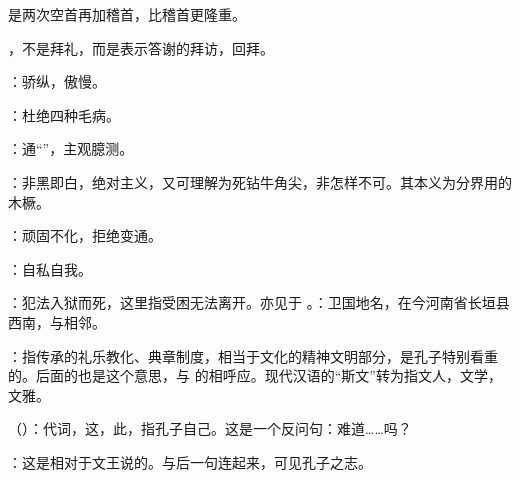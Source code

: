 {\begin{lyitemize}
是两次空首再加稽首，比稽首更隆重。

\end{lyitemize}
 ，不是拜礼，而是表示答谢的拜访，回拜。

\item {}：骄纵，傲慢。
}
{}


{
\item {}：杜绝四种毛病。
\item {}：通“”，主观臆测。
\item {}：非黑即白，绝对主义，又可理解为死钻牛角尖，非怎样不可。其本义为分界用的木橛。%
\item {}：顽固不化，拒绝变通。
\item {}：自私自我。
}
{}


{
\item {}：犯法入狱而死，这里指受困无法离开。亦见于 。：卫国地名，在今河南省长垣县西南，与相邻。%
\item {}：指传承的礼乐教化、典章制度，相当于文化的精神文明部分，是孔子特别看重的。后面的也是这个意思，与  的相呼应。现代汉语的“斯文”转为指文人，文学，文雅。
\item {}（）：代词，这，此，指孔子自己。这是一个反问句：难道……吗？
\item {}：这是相对于文王说的。与后一句连起来，可见孔子之志。
}
{}


